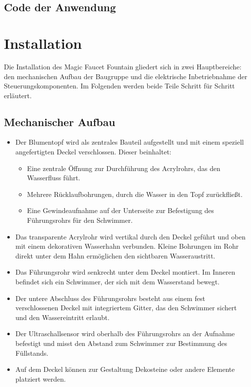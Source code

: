 \subsection{Code der Anwendung}

\begin{code}[H]
	\label{code:codeApplikation}
\end{code}

\section{Installation}
Die Installation des Magic Faucet Fountain gliedert sich in zwei Hauptbereiche: den mechanischen Aufbau der Baugruppe und die elektrische Inbetriebnahme der Steuerungskomponenten. Im Folgenden werden beide Teile Schritt für Schritt erläutert.

\subsection{Mechanischer Aufbau}
\begin{itemize}
	\item Der Blumentopf wird als zentrales Bauteil aufgestellt und mit einem speziell angefertigten Deckel verschlossen. Dieser beinhaltet:
	\begin{itemize}
        	\item Eine zentrale Öffnung zur Durchführung des Acrylrohrs, das den Wasserfluss führt.
        	\item Mehrere Rücklaufbohrungen, durch die Wasser in den Topf zurückfließt.
	        \item Eine Gewindeaufnahme auf der Unterseite zur Befestigung des Führungsrohrs für den Schwimmer.
	\end{itemize}
	\item Das transparente Acrylrohr wird vertikal durch den Deckel geführt und oben mit einem dekorativen Wasserhahn verbunden. Kleine Bohrungen im Rohr direkt unter dem Hahn ermöglichen den sichtbaren Wasseraustritt.
	\item Das Führungsrohr wird senkrecht unter dem Deckel montiert. Im Inneren befindet sich ein Schwimmer, der sich mit dem Wasserstand bewegt.
	\item Der untere Abschluss des Führungsrohrs besteht aus einem fest verschlossenen Deckel mit integriertem Gitter, das den Schwimmer sichert und den Wassereintritt erlaubt.
	\item Der Ultraschallsensor wird oberhalb des Führungsrohrs an der Aufnahme befestigt und misst den Abstand zum Schwimmer zur Bestimmung des Füllstands.
	\item Auf dem Deckel können zur Gestaltung Dekosteine oder andere Elemente platziert werden.
\end{itemize}

